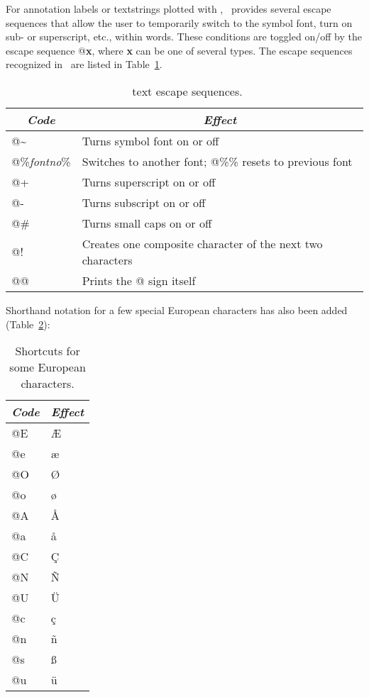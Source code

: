 For annotation labels or textstrings plotted with ,
\GMT\ provides several escape sequences that allow the user to
temporarily switch to the symbol font, turn on sub- or superscript,
etc., within words.  These conditions are toggled on/off by the
escape sequence @{\bf x}, where {\bf x} can be one of several types.
The escape sequences recognized in \GMT\ are listed in Table~\ref{tbl:escape}. 

\begin{table}[H]
\centering
\begin{tabular}{|l|l|} \hline
\multicolumn{1}{|c|}{\emph{Code}}	&	\multicolumn{1}{c|}{\emph{Effect}} \\ \hline
@\~	&	Turns symbol font on or off \\ \hline 
@\%{\it fontno}\%	&	Switches to another font; @\%\% resets to previous font \\ \hline 
@+	&	Turns superscript on or off \\ \hline 
@-	&	Turns subscript on or off \\ \hline 
@\#	&	Turns small caps on or off \\ \hline 
@!	&	Creates one composite character of the next two characters \\ \hline 
@@	&	Prints the @ sign itself \\ \hline 
\end{tabular}
\caption{\gmt\ text escape sequences.}
\label{tbl:escape}
\end{table}

Shorthand notation for a few special European characters has also been
added (Table~\ref{tbl:scand}):

\begin{table}[H]
\centering
\begin{tabular}{|l|l|} \hline
\multicolumn{1}{|c|}{\emph{Code}}	&	\multicolumn{1}{c|}{\emph{Effect}} \\ \hline
@E &  \AE \\ \hline
@e &  \ae \\  \hline
@O &  \O \\ \hline
@o &  \o \\  \hline
@A &  \AA \\ \hline
@a &  \aa \\ \hline
@C &  \c{C} \\ \hline
@N &  \~{N} \\ \hline
@U &  \"{U} \\ \hline
@c &  \c{c} \\ \hline
@n &  \~{n} \\ \hline
@s &  \ss \\ \hline
@u &  \"{u} \\ \hline
\end{tabular}
\caption{Shortcuts for some European characters.}
\label{tbl:scand}
\end{table}

